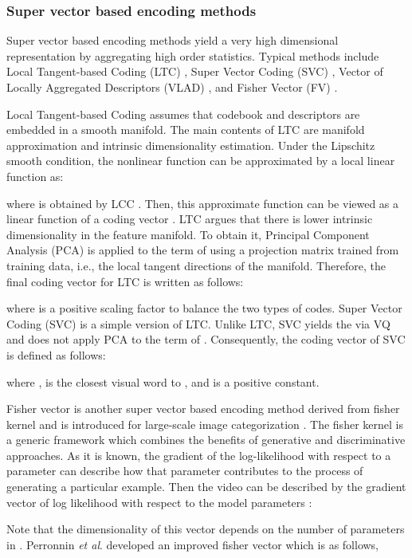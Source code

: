 \documentclass[twocolumn]{svjour3}          \smartqed  \usepackage{slashbox}
\begin{document}
\subsubsection{Super vector based encoding methods}
Super vector based encoding methods yield a very high dimensional representation by aggregating high order statistics. Typical methods include Local Tangent-based Coding (LTC) \cite{YuZ10}, Super Vector Coding (SVC) \cite{ZhouYZH10}, Vector of Locally Aggregated Descriptors (VLAD) \cite{JegouPDSPS12}, and Fisher Vector (FV) \cite{PerronninSM10} .

Local Tangent-based Coding \cite{YuZ10} assumes that codebook and descriptors are embedded in a smooth manifold. The main contents of LTC are manifold approximation and intrinsic dimensionality estimation. Under the Lipschitz smooth condition, the nonlinear function  can be approximated by a local linear function as:

where  is obtained by LCC \cite{YuZG09}. Then, this approximate function can be viewed as a linear function of a coding vector . LTC argues that there is lower intrinsic dimensionality in the feature manifold. To obtain it, Principal Component Analysis (PCA) is applied to the term of  using a projection matrix  trained from training data, i.e., the local tangent directions of the manifold. Therefore, the final coding vector for LTC is written as follows:

where  is a positive scaling factor to balance the two types of codes. Super Vector Coding (SVC) \cite{ZhouYZH10} is a simple version of LTC. Unlike LTC, SVC yields the  via VQ and does not apply PCA to the term of . Consequently, the coding vector of SVC is defined as follows:

where ,  is the closest visual word to , and  is a positive constant.

Fisher vector is another super vector based encoding method derived from fisher kernel \cite{JaakkolaH98} and is introduced for large-scale image categorization \cite{PerronninSM10}. The fisher kernel is a generic framework which combines the benefits of generative and discriminative approaches. As it is known, the gradient of the log-likelihood with respect to a parameter can describe how that parameter contributes to the process of generating a particular example. Then the video can be described by the gradient vector of log likelihood with respect to the model parameters \cite{JaakkolaH98}:

Note that the dimensionality of this vector depends on the number of parameters in . Perronnin \emph{et al}. \cite{PerronninSM10} developed an improved fisher vector which is as follows,
\end{document}
